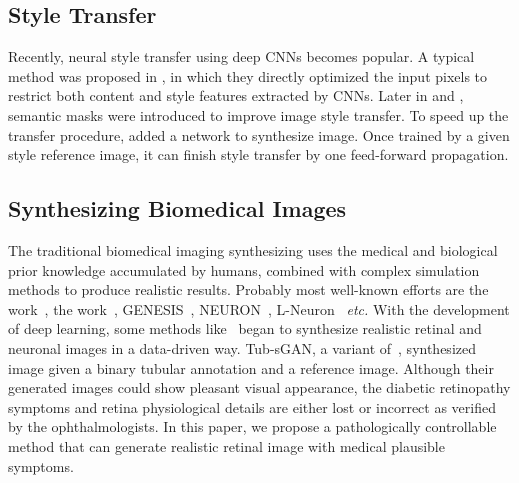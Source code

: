 \documentclass[letterpaper]{article} %
\begin{document}
	\subsection{Style Transfer}
    Recently, neural style transfer using deep CNNs becomes popular. A typical method was proposed in \cite{DBLP:conf/cvpr/GatysEB16}, in which they directly optimized the input pixels to restrict both content and style features extracted by CNNs.
    Later in \cite{DBLP:conf/cvpr/LuanPSB17} and \cite{DBLP:conf/cvpr/GatysEBHS17}, semantic masks were introduced to improve image style transfer.
	To speed up the transfer procedure, \cite{DBLP:conf/eccv/JohnsonAF16} added a network to synthesize image. Once trained by a given style reference image, it can finish style transfer by one feed-forward propagation.


	\subsection{Synthesizing Biomedical Images}

	The traditional biomedical imaging synthesizing uses the medical and biological prior knowledge accumulated by humans, combined with complex simulation methods to produce realistic results. 	Probably most well-known efforts are the work~\cite{fiorini2014automatic}, the work~\cite{bonaldi2016automatic}, GENESIS~\cite{bower2015genesis}, NEURON~\cite{carnevale2006neuron}, L-Neuron~\cite{ascoli2000neuron} \textit{etc.}
	With the development of deep learning, some methods like~\cite{zhao2018synthesizing} began to synthesize realistic retinal and neuronal images in a data-driven way. Tub-sGAN, a variant of~\cite{zhao2018synthesizing}, synthesized image given a binary tubular annotation and a reference image. Although their generated images could show pleasant visual appearance, the diabetic retinopathy symptoms and retina physiological details are either lost or  incorrect as verified by the ophthalmologists. In this paper, we propose a pathologically controllable method that can generate realistic retinal image with medical plausible symptoms.
\end{document}
